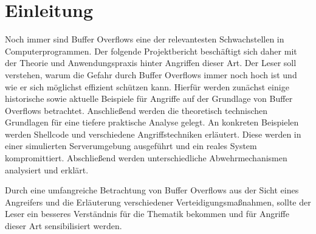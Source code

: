 \section{Einleitung}
Noch immer sind Buffer Overflows eine der relevantesten Schwachstellen in Computerprogrammen. 
Der folgende Projektbericht beschäftigt sich daher mit der Theorie und Anwendungspraxis hinter Angriffen dieser Art.
Der Leser soll verstehen, warum die Gefahr durch Buffer Overflows immer noch hoch ist und wie er sich möglichst effizient schützen kann.
Hierfür werden zunächst einige historische sowie aktuelle Beispiele für Angriffe auf der Grundlage von Buffer Overflows betrachtet.
Anschließend werden die theoretisch technischen Grundlagen für eine tiefere praktische Analyse gelegt.
An konkreten Beispielen werden Shellcode und verschiedene Angriffstechniken erläutert.
Diese werden in einer simulierten Serverumgebung ausgeführt und ein reales System kompromittiert.
Abschließend werden unterschiedliche Abwehrmechanismen analysiert und erklärt.

Durch eine umfangreiche Betrachtung von Buffer Overflows aus der Sicht eines Angreifers und die Erläuterung verschiedener Verteidigungsmaßnahmen, 
sollte der Leser ein besseres Verständnis für die Thematik bekommen und für Angriffe dieser Art sensibilisiert werden.
